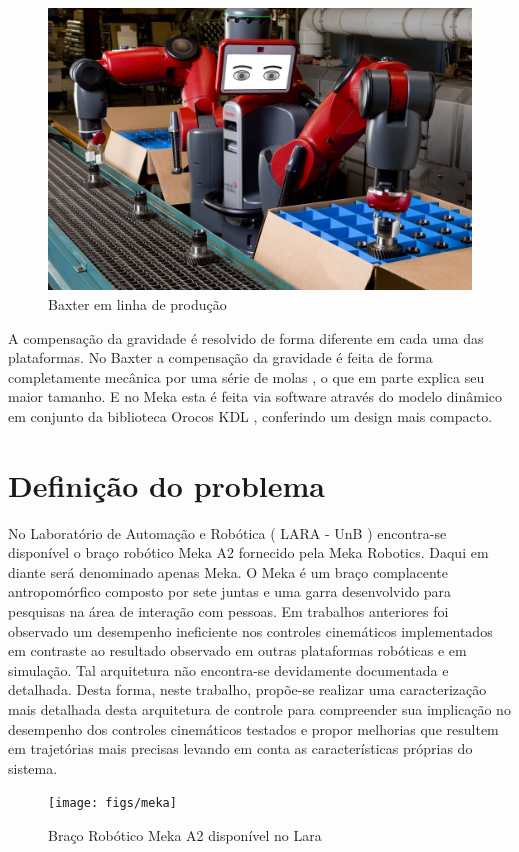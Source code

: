 \begin{figure}[H]
    \centering
    \includegraphics[width = 0.6\linewidth]{tex/figs/baxter_production.jpg}
    \caption{Baxter em linha de produção}
    \label{fig:baxter}
\end{figure}

A compensação da gravidade é resolvido de forma diferente em cada uma das plataformas. No Baxter a compensação da gravidade é feita de forma completamente mecânica por uma série de molas \cite{nobody}, o que em parte explica seu maior tamanho. E no Meka esta é feita via software através do modelo dinâmico em conjunto da biblioteca Orocos KDL \cite{mekaguide}, conferindo um design mais compacto.


\section{Definição do problema}

No Laboratório de Automação e Robótica ( LARA - UnB ) encontra-se disponível o braço robótico Meka A2 fornecido pela Meka Robotics. Daqui em diante será denominado apenas Meka. O Meka é um braço complacente antropomórfico composto por sete juntas e uma garra desenvolvido para pesquisas na área de interação com pessoas. Em trabalhos anteriores foi observado um desempenho ineficiente nos controles cinemáticos implementados em contraste ao resultado observado em outras plataformas robóticas e em simulação. Tal arquitetura não encontra-se devidamente documentada e detalhada. Desta forma, neste trabalho, propõe-se realizar uma caracterização mais detalhada desta arquitetura de controle para compreender sua implicação no desempenho dos controles cinemáticos testados e propor melhorias que resultem em trajetórias mais precisas levando em conta as características próprias do sistema.

\begin{figure}[H]
    \centering
    \texttt{[image: figs/meka]}
    \caption{Braço Robótico Meka A2 disponível no Lara \cite{marcosps2016}}
    \label{fig:meka_arm}
\end{figure}

